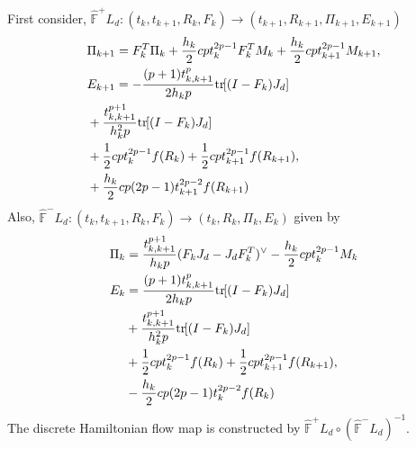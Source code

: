 \documentclass[letterpaper, 10pt, conference]{ieeeconf}
\newcommand{\bracket}[1]{\ensuremath{\left[ #1 \right]}}
\newcommand{\tr}[1]{\mbox{tr}\ensuremath{\negthickspace\bracket{#1}}}
\begin{document}
First consider, $\hat{\mathbb{F}}^+ L_d: (t_k,t_{k+1},R_k,F_k)\rightarrow(t_{k+1}, R_{k+1}, \Pi_{k+1}, E_{k+1})$
\begin{align*}
&    \Pi_{k+1}  = F_k^T \Pi_k + \frac{h_k}{2} cp t_k^{2p-1} F_k^T M_k +\frac{h_k}{2} cpt^{2p-1}_{k+1} M_{k+1},\\
& E_{k+1} = - \frac{(p+1)t_{k,k+1}^p}{2 h_k p} \tr{(I-F_k)J_d}  \\
&     +\frac{t^{p+1}_{k,k+1}}{h_k^2 p} \tr{(I-F_k)J_d}\\
    & + \frac{1}{2}c p t_k^{2p-1} f(R_k) + \frac{1}{2}c p t_{k+1}^{2p-1} f(R_{k+1}),\\
    & +\frac{h_k}{2} c p (2p-1) t_{k+1}^{2p-2} f(R_{k+1}) \\
\end{align*}
Also, $\hat{\mathbb{F}}^- L_d: (t_k,t_{k+1}, R_k, F_k)\rightarrow (t_k, R_k, \Pi_k, E_k)$ given by
\begin{align*}
    \Pi_k & =\frac{t_{k,k+1}^{p+1}}{h_k p} (F_k J_d - J_dF_k^T)^\vee  -\frac{h_k}{2} cp t_k^{2p-1} M_k \\
    E_k & = \frac{(p+1)t_{k,k+1}^p}{ 2 h_k p} \tr{(I-F_k)J_d}  \\
    & +\frac{t^{p+1}_{k,k+1}}{h_k^2 p} \tr{(I-F_k)J_d}\\
    & + \frac{1}{2}c p t_k^{2p-1} f(R_k) + \frac{1}{2}c p t_{k+1}^{2p-1} f(R_{k+1}),\\
    & -\frac{h_k}{2} c p (2p-1) t_k^{2p-2} f(R_k) \\
\end{align*}
The discrete Hamiltonian flow map is constructed by $\hat{\mathbb{F}}^+L_d \circ (\hat{\mathbb{F}}^-L_d)^{-1}$.




\end{document}
